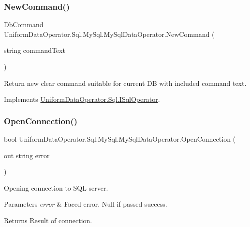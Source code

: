 \subsubsection{\texorpdfstring{New\+Command()}{NewCommand()}\hspace{0.1cm}{\footnotesize\ttfamily [2/2]}}
{\footnotesize\ttfamily Db\+Command Uniform\+Data\+Operator.\+Sql.\+My\+Sql.\+My\+Sql\+Data\+Operator.\+New\+Command (\begin{DoxyParamCaption}\item[{string}]{command\+Text }\end{DoxyParamCaption})}



Return new clear command suitable for current DB with included command text. 



Implements \mbox{\hyperlink{interface_uniform_data_operator_1_1_sql_1_1_i_sql_operator_a10c43a3bfb6e8c88b692488c3341f297}{Uniform\+Data\+Operator.\+Sql.\+I\+Sql\+Operator}}.

\mbox{\label{class_uniform_data_operator_1_1_sql_1_1_my_sql_1_1_my_sql_data_operator_ae7ad4f4d29d927fa8551b087a6e596b5}} 
\subsubsection{\texorpdfstring{Open\+Connection()}{OpenConnection()}}
{\footnotesize\ttfamily bool Uniform\+Data\+Operator.\+Sql.\+My\+Sql.\+My\+Sql\+Data\+Operator.\+Open\+Connection (\begin{DoxyParamCaption}\item[{out string}]{error }\end{DoxyParamCaption})}



Opening connection to S\+QL server. 


\begin{DoxyParams}{Parameters}
{\em error} & Faced error. Null if passed success.\\
\hline
\end{DoxyParams}
\begin{DoxyReturn}{Returns}
Result of connection.
\end{DoxyReturn}


